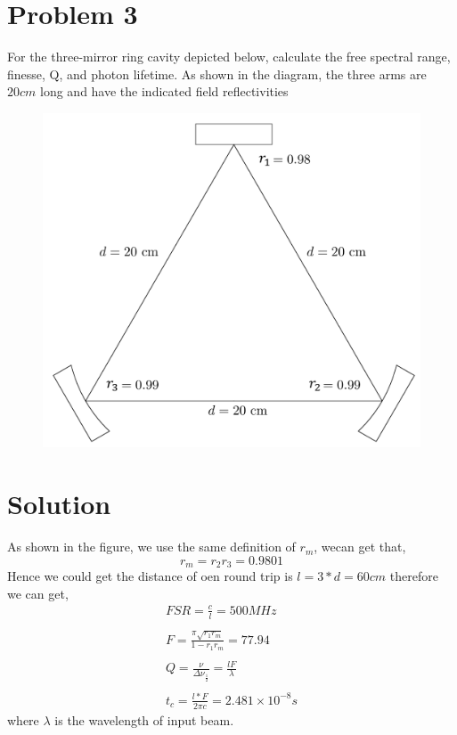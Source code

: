 \documentclass{article}
\begin{document}
\section{Problem 3}
For the three-mirror ring cavity depicted below, calculate the free spectral range,
finesse, Q, and photon lifetime. As shown in the diagram, the three arms are
$20 cm$ long and have the indicated field reflectivities
\begin{figure}[htb]
	\centering
	\includegraphics[width=0.8\linewidth]{f3}
	\label{fig:f2}
\end{figure}

\section*{Solution}

As shown in the figure, we use the same definition of $r_m$, wecan get that,
\begin{equation}\label{key}
r_m=r_2r_3=0.9801
\end{equation} 
Hence we could get the distance of oen round trip is $l=3*d=60cm$ therefore we can get,
\begin{equation}\label{key}
	\begin{array}{l}
		FSR=\frac{c}{l}=500 MHz\\
		\\
		F=\frac{\pi\sqrt{r_1r_m}}{1-r_1r_m}=77.94\\
		\\
		Q=\frac{\nu}{\Delta \nu_{\frac{1}{2}}}=\frac{lF}{\lambda}\\
		\\
		t_c=\frac{l*F}{2\pi c}=2.481\times 10^{-8}s
	\end{array}
\end{equation}
where $\lambda$ is the wavelength of input beam.
\end{document}
